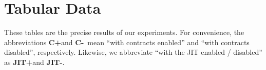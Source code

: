 \section{Tabular Data}

\newcommand{\yesC}{\textbf{C+}}
\newcommand{\noC}{\textbf{C-}}
\newcommand{\yesJIT}{\textbf{JIT+}}
\newcommand{\noJIT}{\textbf{JIT-}}

These tables are the precise results of our experiments.
For convenience, the abbreviations \yesC and \noC~mean ``with contracts enabled'' and ``with contracts disabled'', respectively.
Likewise, we abbreviate ``with the JIT enabled / disabled'' as \yesJIT and \noJIT.


\newpage

\newpage

\newpage

\newpage

\newpage

\newpage

\newpage

\newpage

\newpage

\newpage
